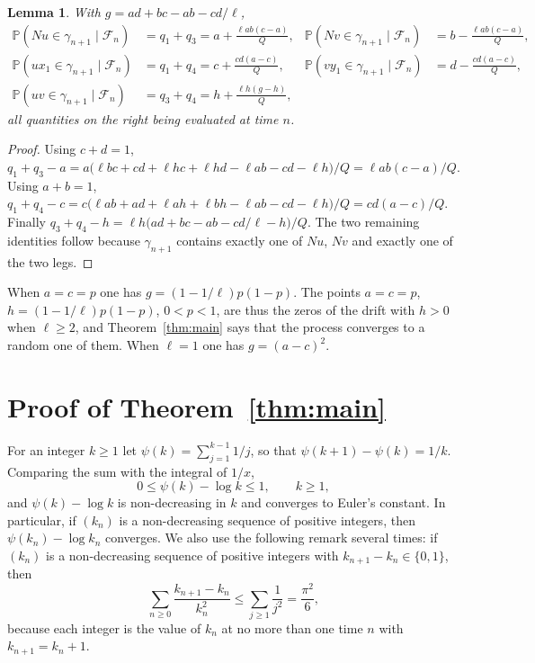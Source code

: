 \documentclass[11pt]{amsart}
\newtheorem{lemma}[theorem]{Lemma}
\theoremstyle{remark}
\newcommand{\PP}{\mathbb{P}}
\newcommand{\cF}{\mathcal{F}}
\begin{document}
\begin{lemma}\label{lem:drift}
With $g=ad+bc-ab-cd/\ell$,
\begin{align*}
\PP(Nu\in\gamma_{n+1}\mid\cF_n)&=q_1+q_3=a+\frac{\ell ab(c-a)}{Q}, &
\PP(Nv\in\gamma_{n+1}\mid\cF_n)&=b-\frac{\ell ab(c-a)}{Q},\\
\PP(ux_1\in\gamma_{n+1}\mid\cF_n)&=q_1+q_4=c+\frac{cd(a-c)}{Q}, &
\PP(vy_1\in\gamma_{n+1}\mid\cF_n)&=d-\frac{cd(a-c)}{Q},\\
\PP(uv\in\gamma_{n+1}\mid\cF_n)&=q_3+q_4=h+\frac{\ell h(g-h)}{Q}, &&
\end{align*}
all quantities on the right being evaluated at time $n$.
\end{lemma}
\begin{proof}
Using $c+d=1$,
$q_1+q_3-a=a\bigl(\ell bc+cd+\ell hc+\ell hd-\ell ab-cd-\ell h\bigr)/Q=\ell ab(c-a)/Q$. Using $a+b=1$,
$q_1+q_4-c=c\bigl(\ell ab+ad+\ell ah+\ell bh-\ell ab-cd-\ell h\bigr)/Q=cd(a-c)/Q$. Finally
$q_3+q_4-h=\ell h\bigl(ad+bc-ab-cd/\ell-h\bigr)/Q$. The two remaining identities follow because $\gamma_{n+1}$
contains exactly one of $Nu$, $Nv$ and exactly one of the two legs.
\end{proof}

When $a=c=p$ one has $g=(1-1/\ell)p(1-p)$. The points $a=c=p$, $h=(1-1/\ell)p(1-p)$, $0<p<1$, are thus the zeros of
the drift with $h>0$ when $\ell\ge2$, and Theorem~\ref{thm:main} says that the process converges to a random one of
them. When $\ell=1$ one has $g=(a-c)^2$.

\section{Proof of Theorem~\ref{thm:main}}

For an integer $k\ge1$ let $\psi(k)=\sum_{j=1}^{k-1}1/j$, so that $\psi(k+1)-\psi(k)=1/k$. Comparing the sum with the
integral of $1/x$,
\begin{equation}\label{eq:psi}
0\le\psi(k)-\log k\le1,\qquad k\ge1,
\end{equation}
and $\psi(k)-\log k$ is non-decreasing in $k$ and converges to Euler's constant. In particular, if $(k_n)$ is a
non-decreasing sequence of positive integers, then $\psi(k_n)-\log k_n$ converges. We also use the following remark
several times: if $(k_n)$ is a non-decreasing sequence of positive integers with $k_{n+1}-k_n\in\{0,1\}$, then
\begin{equation}\label{eq:pi}
\sum_{n\ge0}\frac{k_{n+1}-k_n}{k_n^2}\le\sum_{j\ge1}\frac1{j^2}=\frac{\pi^2}{6},
\end{equation}
because each integer is the value of $k_n$ at no more than one time $n$ with $k_{n+1}=k_n+1$.
\end{document}
